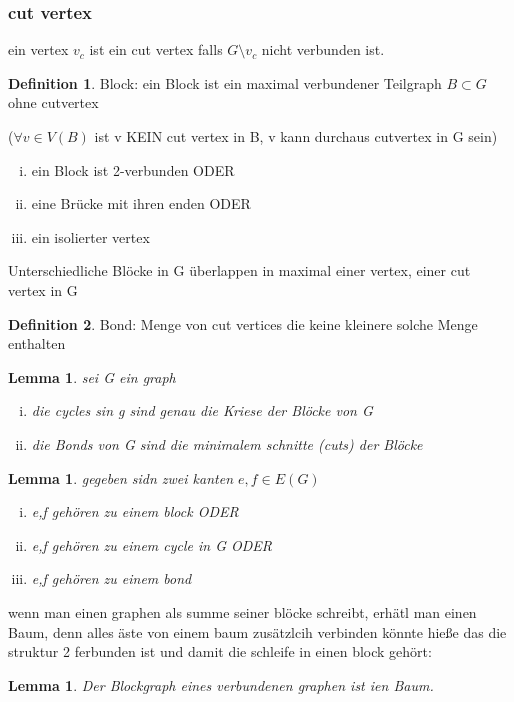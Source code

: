 \documentclass[a4paper]{article}
\newtheorem{lemma}[theorem]{Lemma}
\theoremstyle{definition}
\newtheorem*{definition}{Definition}
\theoremstyle{remark}
\begin{document}
\subsubsection{cut vertex}
\label{ssub:cut_vertex}

ein vertex $v_c$ ist ein cut vertex falls $G\setminus v_c$ nicht verbunden ist.
\begin{definition}
	Block: ein Block ist ein maximal verbundener Teilgraph $ B\subset G$ ohne cutvertex 
\end{definition}
($\forall v \in V(B)$ ist v KEIN cut vertex in B, v kann durchaus cutvertex in G sein)
\begin{enumerate}[(i)]
  \item ein Block ist 2-verbunden ODER
  \item eine Brücke mit ihren enden ODER
  \item ein isolierter vertex
\end{enumerate}
Unterschiedliche Blöcke in G überlappen in maximal einer vertex, einer cut vertex in G\\
\begin{definition}
  Bond: Menge von cut vertices die keine kleinere solche Menge enthalten
\end{definition}
\begin{lemma}
  sei G ein graph 
  \begin{enumerate}[(i)]
    \item die cycles sin g sind genau die Kriese der Blöcke von G
    \item die Bonds von G sind die minimalem schnitte (cuts) der Blöcke
  \end{enumerate}
\end{lemma}
\begin{lemma}
  gegeben sidn zwei  kanten  $ e,f \in E(G)$ 
  \begin{enumerate}[(i)]
    \item e,f gehören zu einem block ODER
    \item e,f gehören zu einem cycle in G ODER
    \item e,f gehören zu einem bond
  \end{enumerate}
\end{lemma}
wenn man einen graphen als summe seiner blöcke schreibt, erhätl man einen Baum, denn alles äste von einem baum zusätzlcih verbinden könnte hieße das die struktur 2 ferbunden ist und damit die schleife in einen block gehört:
\begin{lemma}
  Der Blockgraph eines verbundenen graphen ist ien Baum.
\end{lemma}
\end{document}
